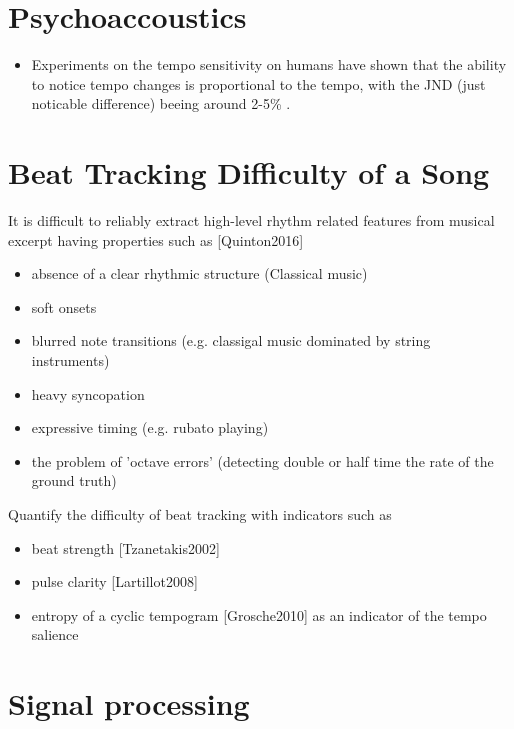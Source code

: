 \documentclass{article}
\begin{document}
\section{Psychoaccoustics}

\begin{itemize}
\item Experiments on the tempo sensitivity on humans have shown that the ability to notice tempo changes is proportional to the tempo, with the JND (just noticable difference) beeing around 2-5\% \cite{Drake1993}.
\end{itemize}


\section{Beat Tracking Difficulty of a Song}
It is difficult to reliably extract high-level rhythm related features from musical excerpt having properties such as [Quinton2016]
\begin{itemize}
\item absence of a clear rhythmic structure (Classical music)
\item soft onsets
\item blurred note transitions (e.g. classigal music dominated by string instruments)
\item heavy syncopation
\item expressive timing (e.g. rubato playing)
\item the problem of 'octave errors' (detecting double or half time the rate of the ground truth)
\end{itemize}
\vspace{1em}
Quantify the difficulty of beat tracking with indicators such as
\begin{itemize}
\item beat strength [Tzanetakis2002]
\item pulse clarity [Lartillot2008]
\item entropy of a cyclic tempogram [Grosche2010] as an indicator of the tempo salience  
\end{itemize}

\section{Signal processing}
\end{document}
